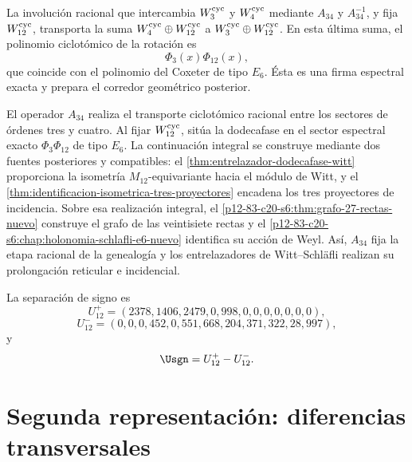 La involución racional que intercambia \(W_3^{\rm cyc}\) y
\(W_4^{\rm cyc}\) mediante \(A_{34}\) y \(A_{34}^{-1}\), y fija
\(W_{12}^{\rm cyc}\), transporta la suma
\(W_4^{\rm cyc}\oplus W_{12}^{\rm cyc}\) a
\(W_3^{\rm cyc}\oplus W_{12}^{\rm cyc}\). En esta última suma, el polinomio
ciclotómico de la rotación es
\[
 \Phi_3(x)\Phi_{12}(x),
\]
que coincide con el polinomio del Coxeter de tipo \(E_6\). Ésta es una firma
espectral exacta y prepara el corredor geométrico posterior.

\begin{statusbox}[title={Transporte racional y continuación integral}]
El operador \(A_{34}\) realiza el transporte ciclotómico racional entre los
sectores de órdenes tres y cuatro. Al fijar \(W_{12}^{\rm cyc}\), sitúa la
dodecafase en el sector espectral exacto
\(\Phi_3\Phi_{12}\) de tipo \(E_6\). La continuación integral se construye
mediante dos fuentes posteriores y compatibles: el
\cref{thm:entrelazador-dodecafase-witt} proporciona la isometría
\(M_{12}\)-equivariante hacia el módulo de Witt, y el
\cref{thm:identificacion-isometrica-tres-proyectores} encadena los tres
proyectores de incidencia. Sobre esa realización integral, el
\cref{p12-83-c20-s6:thm:grafo-27-rectas-nuevo} construye el grafo de las
veintisiete rectas y el
\cref{p12-83-c20-s6:chap:holonomia-schlafli-e6-nuevo} identifica su acción de
Weyl. Así, \(A_{34}\) fija la etapa racional de la genealogía y los
entrelazadores de Witt--Schläfli realizan su prolongación reticular e
incidencial.
\end{statusbox}

La separación de signo es
\[
U_{12}^{+}
=(2378,1406,2479,0,998,0,0,0,0,0,0,0),
\]
\[
U_{12}^{-}
=(0,0,0,452,0,551,668,204,371,322,28,997),
\]
y
\[
\Usgn=U_{12}^{+}-U_{12}^{-}.
\]

\section{Segunda representación: diferencias transversales}

